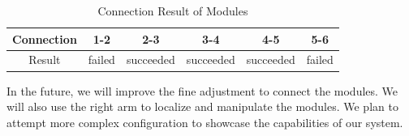 \begin{table}[h]
\caption{Connection Result of Modules} %
\begin{tabular}{c |c |c |c |c |c|}
\hline
 Connection &  1-2 & 2-3 & 3-4 & 4-5 & 5-6 \\\hline 
  Result  & failed & succeeded & succeeded & succeeded & failed \\\hline  
\end{tabular}\label{table:result}
\end{table}

In the future, we will improve the fine adjustment to connect the modules. We will also use the right arm to localize and manipulate the modules. We plan to attempt more complex configuration to showcase the capabilities of our system.


